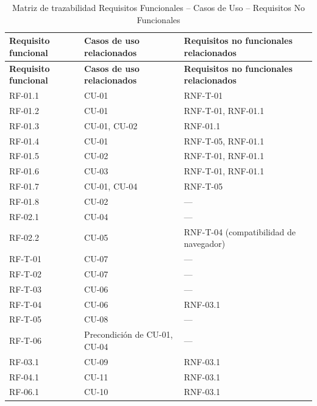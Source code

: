\small
\begin{longtable}{>{\raggedright\arraybackslash}p{3.4cm} >{\raggedright\arraybackslash}p{5.6cm} >{\raggedright\arraybackslash}p{5.6cm}}
    \caption{Matriz de trazabilidad Requisitos Funcionales -- Casos de Uso -- Requisitos No Funcionales}
    \label{tab:trazabilidad} \\
    \toprule
    \textbf{Requisito funcional} & \textbf{Casos de uso relacionados} & \textbf{Requisitos no funcionales relacionados} \\
    \midrule
    \endfirsthead
    \toprule
    \textbf{Requisito funcional} & \textbf{Casos de uso relacionados} & \textbf{Requisitos no funcionales relacionados} \\
    \midrule
    \endhead
    RF-01.1 & CU-01 & RNF-T-01 \\
    RF-01.2 & CU-01 & RNF-T-01, RNF-01.1 \\
    RF-01.3 & CU-01, CU-02 & RNF-01.1 \\
    RF-01.4 & CU-01 & RNF-T-05, RNF-01.1 \\
    RF-01.5 & CU-02 & RNF-T-01, RNF-01.1 \\
    RF-01.6 & CU-03 & RNF-T-01, RNF-01.1 \\
    RF-01.7 & CU-01, CU-04 & RNF-T-05 \\
    RF-01.8 & CU-02 & --- \\
    RF-02.1 & CU-04 & --- \\
    RF-02.2 & CU-05 & RNF-T-04 (compatibilidad de navegador) \\
    RF-T-01 & CU-07 & --- \\
    RF-T-02 & CU-07 & --- \\
    RF-T-03 & CU-06 & --- \\
    RF-T-04 & CU-06 & RNF-03.1 \\
    RF-T-05 & CU-08 & --- \\
    RF-T-06 & Precondición de CU-01, CU-04 & --- \\
    \midrule
    RF-03.1 & CU-09 & RNF-03.1 \\
    RF-04.1 & CU-11 & RNF-03.1 \\
    RF-06.1 & CU-10 & RNF-03.1 \\
    \bottomrule
\end{longtable}

